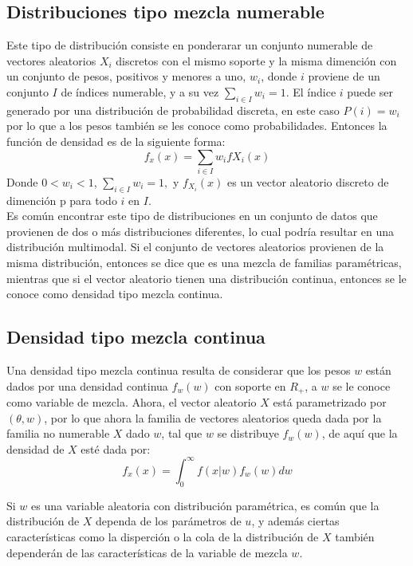 \documentclass[11pt]{book}
\begin{document}
\subsection*{Distribuciones tipo mezcla numerable}
Este tipo de distribución consiste en ponderarar un conjunto numerable de vectores aleatorios $X_{i}$  discretos con el mismo soporte y la misma dimención con un conjunto de pesos, positivos y menores a uno, $w_{i}$, donde $i$ proviene de un conjunto $I$ de índices numerable, y a su vez $\sum_{i\in I}w_{i}=1$. El índice $i$ puede ser generado por una distribución de probabilidad discreta, en este caso $P(i)=w_{i}$ por lo que a los pesos también se les conoce como probabilidades. Entonces la función de densidad es de la siguiente forma:\\
\begin{equation*}
f_{x}(x)= \sum_{i\in I}w_{i}f{X_{i}}(x)
\end{equation*}
 Donde  $0<w_{i}<1$, $\sum_{i\in I}w_{i}=1,$ y $  f_{X_{i}}(x)$ es un vector aleatorio discreto de dimención p para todo $i$ en $I$.\\

Es común encontrar este tipo de distribuciones en un conjunto de datos que provienen de dos o más distribuciones diferentes, lo cual podría resultar en una distribución multimodal. Si el conjunto de vectores aleatorios provienen de la misma distribución, entonces se dice que es una mezcla de familias paramétricas, mientras que si el vector aleatorio tienen una distribución continua, entonces se le conoce como densidad tipo mezcla continua.\\

\subsection*{Densidad tipo mezcla continua}
Una densidad tipo mezcla continua resulta de considerar que los pesos $w$ están dados por una densidad continua $f_{w}(w)$ con soporte en $R_{+}$, a $w$ se le conoce como variable de mezcla. Ahora, el vector aleatorio $X$ está parametrizado por $(\theta,w)$, por lo que ahora la familia de vectores aleatorios queda dada por la familia no numerable  $ X$ dado $w$, tal que $w$ se distribuye $f_{w}(w) $, de aquí que la densidad de $X$ esté dada por:\\
\begin{equation*}
f_{x}(x)=\int_{0}^{\infty}f(x|w)f_{w}(w)dw 
\end{equation*}


Si $w$ es una variable aleatoria con distribución paramétrica, es común que la distribución de $X$ dependa de los parámetros de $u$, y además ciertas características como la disperción o la cola de la distribución de $X$ también dependerán de las características de la variable de mezcla $w$.\\
\end{document}
